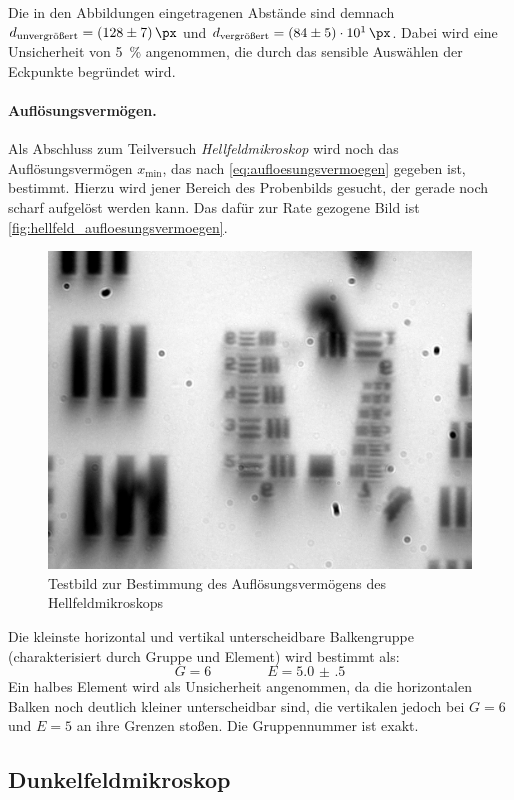 \documentclass[ngerman]{scrartcl}
\begin{document}
\setcaphanging
%
Die in den Abbildungen eingetragenen Abstände sind demnach $d_\text{unvergrößert}=\SI{128(7)}{\px}$ und $d_\text{vergrößert}=\SI{84(5)e1}{\px}$. Dabei wird eine Unsicherheit von \SI{5}{\percent} angenommen, die durch das sensible Auswählen der Eckpunkte begründet wird.

\paragraph{Auflösungsvermögen.}
Als Abschluss zum Teilversuch \textit{Hellfeldmikroskop} wird noch das Auflösungsvermögen $x_\text{min}$, das nach \autoref{eq:aufloesungsvermoegen} gegeben ist, bestimmt. Hierzu wird jener Bereich des Probenbilds gesucht, der gerade noch scharf aufgelöst werden kann. Das dafür zur Rate gezogene Bild ist \autoref{fig:hellfeld_aufloesungsvermoegen}.
%
\begin{figure}[H]
    \centering
    \begin{samepage}
        \includegraphics[width=0.475\linewidth]{fig/Versuch3/hellfeld_4.2_aufloesungsvermoegen.jpg}
        \caption[Hellfeld Auflösungsvermögen]{Testbild zur Bestimmung des Auflösungsvermögens des Hellfeldmikroskops}
        \label{fig:hellfeld_aufloesungsvermoegen}
    \end{samepage}
\end{figure}
Die kleinste horizontal und vertikal unterscheidbare Balkengruppe (charakterisiert durch Gruppe und Element) wird bestimmt als:
\[G=6 \qquad\qquad E=\num{5.0(5)}\]
Ein halbes Element wird als Unsicherheit angenommen, da die horizontalen Balken noch deutlich kleiner unterscheidbar sind, die vertikalen jedoch bei $G=6$ und $E=5$ an ihre Grenzen stoßen. Die Gruppennummer ist exakt.


\subsection{Dunkelfeldmikroskop}
\label{subsec:durchfuehrung_dunkelfeld}
\end{document}
